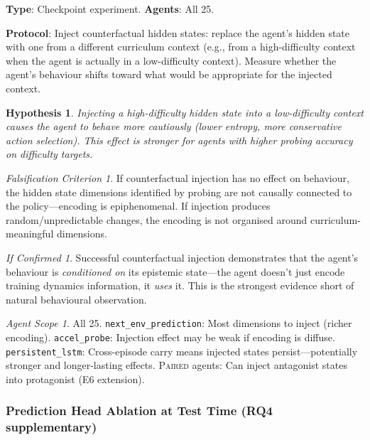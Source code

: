 \documentclass[11pt,a4paper]{article}
\newtheorem{hypothesis}{Hypothesis}[subsection]
\theoremstyle{remark}
\newtheorem*{falsification}{Falsification Criterion}
\newtheorem*{implication}{If Confirmed}
\newtheorem*{agentscope}{Agent Scope}
\newcommand{\paired}{\textsc{Paired}}
\begin{document}
\textbf{Type}: Checkpoint experiment. \textbf{Agents}: All 25.

\textbf{Protocol}: Inject counterfactual hidden states: replace the agent's hidden state with one from a different curriculum context (e.g., from a high-difficulty context when the agent is actually in a low-difficulty context). Measure whether the agent's behaviour shifts toward what would be appropriate for the injected context.

\begin{hypothesis}
Injecting a high-difficulty hidden state into a low-difficulty context causes the agent to behave more cautiously (lower entropy, more conservative action selection). This effect is stronger for agents with higher probing accuracy on difficulty targets.
\end{hypothesis}

\begin{falsification}
If counterfactual injection has no effect on behaviour, the hidden state dimensions identified by probing are not causally connected to the policy---encoding is epiphenomenal. If injection produces random/unpredictable changes, the encoding is not organised around curriculum-meaningful dimensions.
\end{falsification}

\begin{implication}
Successful counterfactual injection demonstrates that the agent's behaviour is \textit{conditioned on} its epistemic state---the agent doesn't just encode training dynamics information, it \textit{uses} it. This is the strongest evidence short of natural behavioural observation.
\end{implication}

\begin{agentscope}
All 25. \texttt{next\_env\_prediction}: Most dimensions to inject (richer encoding). \texttt{accel\_probe}: Injection effect may be weak if encoding is diffuse. \texttt{persistent\_lstm}: Cross-episode carry means injected states persist---potentially stronger and longer-lasting effects. \paired{} agents: Can inject antagonist states into protagonist (E6 extension).
\end{agentscope}

\subsubsection{Prediction Head Ablation at Test Time (RQ4 supplementary)}
\label{exp:pred_head_ablation}
\end{document}
